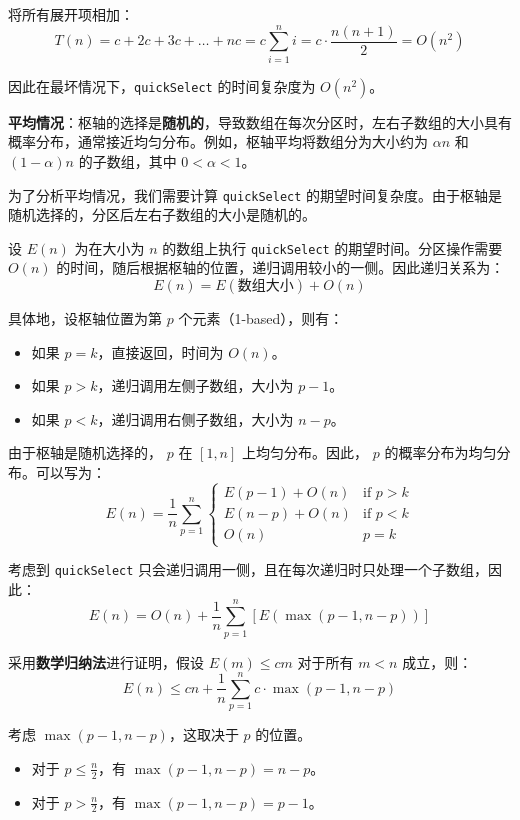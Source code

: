 将所有展开项相加：\[T(n) = c + 2c + 3c + \dots + nc = c \sum_{i=1}^{n} i = c \cdot \frac{n(n + 1)}{2} = O(n^2)\]

因此在最坏情况下，\texttt{quickSelect} 的时间复杂度为 $O(n^2)$。

\textbf{平均情况}：枢轴的选择是\textbf{随机的}，导致数组在每次分区时，左右子数组的大小具有概率分布，通常接近均匀分布。例如，枢轴平均将数组分为大小约为 $\alpha n$ 和 $(1 - \alpha)n$ 的子数组，其中 $0 < \alpha < 1$。

为了分析平均情况，我们需要计算 \texttt{quickSelect} 的期望时间复杂度。由于枢轴是随机选择的，分区后左右子数组的大小是随机的。

设 $E(n)$ 为在大小为 $n$ 的数组上执行 \texttt{quickSelect} 的期望时间。分区操作需要 $O(n)$ 的时间，随后根据枢轴的位置，递归调用较小的一侧。因此递归关系为：\[E(n)=E(\text{数组大小}) + O(n)\]

具体地，设枢轴位置为第 $p$ 个元素（1-based），则有：
\begin{itemize}
    \item 如果 $p = k$，直接返回，时间为 $O(n)$。
	\item 如果 $p > k$，递归调用左侧子数组，大小为 $p - 1$。
	\item 如果 $p < k$，递归调用右侧子数组，大小为 $n - p$。
\end{itemize}

由于枢轴是随机选择的， $p$ 在 $[1, n]$ 上均匀分布。因此， $p$ 的概率分布为均匀分布。可以写为：
\[E(n)=\frac{1}{n}\sum_{p=1}^{n}\begin{cases}
    E(p-1)+O(n) & \text{if } p>k\\
    E(n-p)+O(n) & \text{if } p<k\\
    O(n) & p=k
\end{cases}\]

考虑到 \texttt{quickSelect} 只会递归调用一侧，且在每次递归时只处理一个子数组，因此：
\[E(n)=O(n)+\frac{1}{n}\sum_{p=1}^{n}[E(\max(p-1,n-p))]\]

采用\textbf{数学归纳法}进行证明，假设 \( E(m) \leq c m \) 对于所有 \( m < n \) 成立，则：\[
E(n) \leq c n + \frac{1}{n} \sum_{p=1}^{n} c \cdot \max(p - 1, n - p)
\]

考虑 \( \max(p - 1, n - p) \)，这取决于 \( p \) 的位置。\begin{itemize}
    \item 对于 \( p \leq \frac{n}{2} \)，有 \( \max(p - 1, n - p) = n - p \)。
    \item 对于 \( p > \frac{n}{2} \)，有 \( \max(p - 1, n - p) = p - 1 \)。
\end{itemize}


